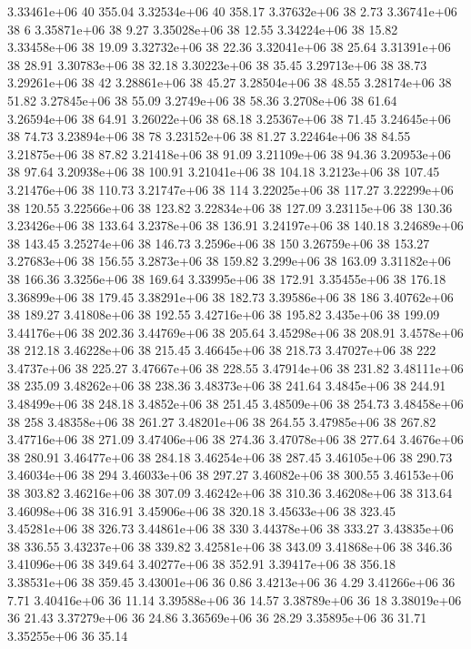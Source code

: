 3.33461e+06 40 355.04
3.32534e+06 40 358.17
3.37632e+06 38 2.73
3.36741e+06 38 6
3.35871e+06 38 9.27
3.35028e+06 38 12.55
3.34224e+06 38 15.82
3.33458e+06 38 19.09
3.32732e+06 38 22.36
3.32041e+06 38 25.64
3.31391e+06 38 28.91
3.30783e+06 38 32.18
3.30223e+06 38 35.45
3.29713e+06 38 38.73
3.29261e+06 38 42
3.28861e+06 38 45.27
3.28504e+06 38 48.55
3.28174e+06 38 51.82
3.27845e+06 38 55.09
3.2749e+06 38 58.36
3.2708e+06 38 61.64
3.26594e+06 38 64.91
3.26022e+06 38 68.18
3.25367e+06 38 71.45
3.24645e+06 38 74.73
3.23894e+06 38 78
3.23152e+06 38 81.27
3.22464e+06 38 84.55
3.21875e+06 38 87.82
3.21418e+06 38 91.09
3.21109e+06 38 94.36
3.20953e+06 38 97.64
3.20938e+06 38 100.91
3.21041e+06 38 104.18
3.2123e+06 38 107.45
3.21476e+06 38 110.73
3.21747e+06 38 114
3.22025e+06 38 117.27
3.22299e+06 38 120.55
3.22566e+06 38 123.82
3.22834e+06 38 127.09
3.23115e+06 38 130.36
3.23426e+06 38 133.64
3.2378e+06 38 136.91
3.24197e+06 38 140.18
3.24689e+06 38 143.45
3.25274e+06 38 146.73
3.2596e+06 38 150
3.26759e+06 38 153.27
3.27683e+06 38 156.55
3.2873e+06 38 159.82
3.299e+06 38 163.09
3.31182e+06 38 166.36
3.3256e+06 38 169.64
3.33995e+06 38 172.91
3.35455e+06 38 176.18
3.36899e+06 38 179.45
3.38291e+06 38 182.73
3.39586e+06 38 186
3.40762e+06 38 189.27
3.41808e+06 38 192.55
3.42716e+06 38 195.82
3.435e+06 38 199.09
3.44176e+06 38 202.36
3.44769e+06 38 205.64
3.45298e+06 38 208.91
3.4578e+06 38 212.18
3.46228e+06 38 215.45
3.46645e+06 38 218.73
3.47027e+06 38 222
3.4737e+06 38 225.27
3.47667e+06 38 228.55
3.47914e+06 38 231.82
3.48111e+06 38 235.09
3.48262e+06 38 238.36
3.48373e+06 38 241.64
3.4845e+06 38 244.91
3.48499e+06 38 248.18
3.4852e+06 38 251.45
3.48509e+06 38 254.73
3.48458e+06 38 258
3.48358e+06 38 261.27
3.48201e+06 38 264.55
3.47985e+06 38 267.82
3.47716e+06 38 271.09
3.47406e+06 38 274.36
3.47078e+06 38 277.64
3.4676e+06 38 280.91
3.46477e+06 38 284.18
3.46254e+06 38 287.45
3.46105e+06 38 290.73
3.46034e+06 38 294
3.46033e+06 38 297.27
3.46082e+06 38 300.55
3.46153e+06 38 303.82
3.46216e+06 38 307.09
3.46242e+06 38 310.36
3.46208e+06 38 313.64
3.46098e+06 38 316.91
3.45906e+06 38 320.18
3.45633e+06 38 323.45
3.45281e+06 38 326.73
3.44861e+06 38 330
3.44378e+06 38 333.27
3.43835e+06 38 336.55
3.43237e+06 38 339.82
3.42581e+06 38 343.09
3.41868e+06 38 346.36
3.41096e+06 38 349.64
3.40277e+06 38 352.91
3.39417e+06 38 356.18
3.38531e+06 38 359.45
3.43001e+06 36 0.86
3.4213e+06 36 4.29
3.41266e+06 36 7.71
3.40416e+06 36 11.14
3.39588e+06 36 14.57
3.38789e+06 36 18
3.38019e+06 36 21.43
3.37279e+06 36 24.86
3.36569e+06 36 28.29
3.35895e+06 36 31.71
3.35255e+06 36 35.14
